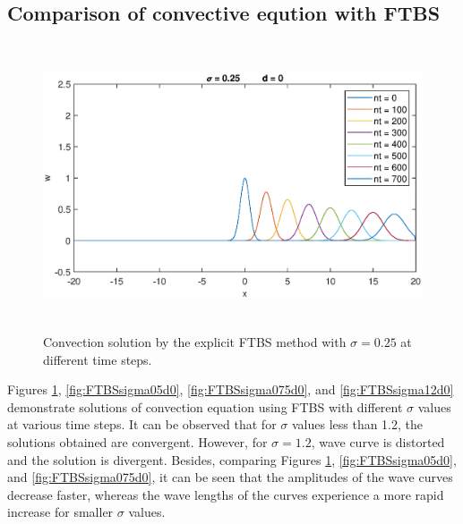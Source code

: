 \documentclass[letterpaper,12pt]{article}
\begin{document}
\subsection{Comparison of convective eqution with FTBS}
\begin{figure}[H] 
	\centering 
	\includegraphics[max height=8.5cm]{graphs/FTBS/Convection/sigma025d0.eps}
	\caption{Convection solution by the explicit FTBS method with $\sigma= 0.25$ at different time steps.}
	 \label{fig:FTBSsigma025d0}
\end{figure}

Figures \ref{fig:FTBSsigma025d0}, \ref{fig:FTBSsigma05d0}, \ref{fig:FTBSsigma075d0}, and \ref{fig:FTBSsigma12d0}
demonstrate solutions of convection equation using FTBS with different $\sigma$ values at various time
steps. It can be observed that for $\sigma$ values less than 1.2, the solutions obtained are convergent.
However, for $\sigma = 1.2$, wave curve is distorted and the solution is divergent. Besides, comparing Figures
\ref{fig:FTBSsigma025d0}, \ref{fig:FTBSsigma05d0}, and \ref{fig:FTBSsigma075d0}, it can be seen that the
amplitudes of the wave curves decrease faster, whereas the wave lengths of the curves experience a more rapid
increase for smaller $\sigma$ values.

\newpage
\end{document}
